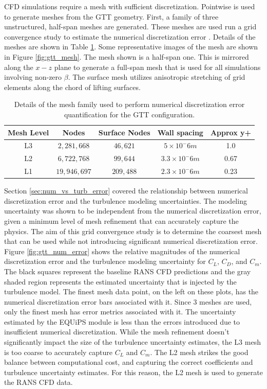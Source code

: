 CFD simulations require a mesh with sufficient discretization.
Pointwise is used to generate meshes from the GTT geometry. 
First, a family of three unstructured, half-span meshes are generated.
These meshes are used run a grid convergence study to estimate the numerical discretization error \cite{american_society_of_mechanical_engineers_standard_2009}. 
Details of the meshes are shown in Table \ref{tab:gtt_meshes}.
Some representative images of the mesh are shown in Figure \ref{fig:gtt_mesh}.
The mesh shown is a half-span one.
This is mirrored along the $x-z$ plane to generate a full-span mesh that is used for all simulations involving non-zero $\beta$.
The surface mesh utilizes anisotropic stretching of grid elements along the chord of lifting surfaces. 

\begin{table}
    \renewcommand{\arraystretch}{1.2}
    \centering
    \begin{tabular}{ c|c|c|c|c } 
         Mesh Level & Nodes & Surface Nodes & Wall spacing & Approx y+  \\ 
         \hline
         L3 & $2,281,668$ & $46,621$ & $5\times10^-6 m$ & 1.0 \\
         L2 & $6,722,768$ & $99,644$ & $3.3\times10^-6 m$ & 0.67 \\
         L1 & $19,946,697$ & $209,488$ & $2.3\times10^-6 m$ & 0.23 \\
         
    \end{tabular}
    \caption{Details of the mesh family used to perform numerical discretization error quantification for the GTT configuration.}
    \label{tab:gtt_meshes}
\end{table}

Section \ref{sec:num_vs_turb_error} covered the relationship between numerical discretization error and the turbulence modeling uncertainties. 
The modeling uncertainty was shown to be independent from the numerical discretization error, given a minimum level of mesh refinement that can accurately capture the physics. 
The aim of this grid convergence study is to determine the coarsest mesh that can be used while not introducing significant numerical discretization error. 
Figure \ref{fig:gtt_num_error} shows the relative magnitudes of the numerical discretization error and the turbulence modeling uncertainty for $C_L$, $C_D$, and $C_m$. 
The black squares represent the baseline RANS CFD predictions and the gray shaded region represents the estimated uncertainty that is injected by the turbulence model. 
The finest mesh data point, on the left on these plots, has the numerical discretization error bars associated with it. 
Since 3 meshes are used, only the finest mesh has error metrics associated with it. 
The uncertainty estimated by the EQUiPS module is less than the errors introduced due to insufficient numerical discretization.
While the mesh refinement doesn't significantly impact the size of the turbulence uncertainty estimates, the L3 mesh is too coarse to accurately capture $C_L$ and $C_m$. 
The L2 mesh strikes the good balance between computational cost, and capturing the correct coefficients and turbulence uncertainty estimates.  
For this reason, the L2 mesh is used to generate the RANS CFD data. 

